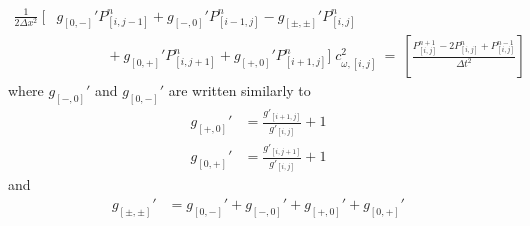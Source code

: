 \documentclass{article} %
\begin{document}
	\begin{equation}
		\begin{split} \label{eq:discr_c} 
			\frac{1}{2 \Delta x^{2}} \: \Big[ &g_{[0,-]}' P_{[i,j-1]}^{n} + g_{[-,0]}' P_{[i-1,j]}^{n}
			-  g_{[\pm,\pm]}' P_{[i,j]}^{n} \\
			&\quad \quad \quad \; \; + g_{[0,+]}' P_{[i,j+1]}^{n} + g_{[+,0]}' P_{[i+1,j]}^{n} \Big] \; c_{\omega,[i,j]}^{2}
			\: = \: \left[ \frac{ P^{n+1}_{[i,j]} - 2P_{[i,j]}^{n} + P^{n-1}_{[i,j]} }{\Delta t^{2}} \right]
		\end{split}
	\end{equation}
	where $g_{[-,0]}'$ and $g_{[0,-]}'$ are written similarly to
	\begin{align}
	g_{[+,0]}'     &= \frac{g'_{[i+1,j]}}{g'_{[i,j]}}+1 \: \label{ratio1} \\ 
	g_{[0,+]}'     &= \frac{g'_{[i,j+1]}}{g'_{[i,j]}}+1 \:  \label{ratio2}
	\end{align}
	and
	\begin{align}
	g_{[\pm,\pm]}' &= g_{[0,-]}' + g_{[-,0]}' +  g_{[+,0]}' +  g_{[0,+]}' \: \label{rho_coeffs}  \nonumber
	\end{align}
\end{document}
